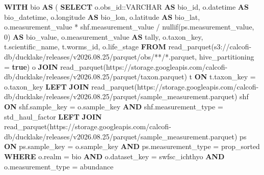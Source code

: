 \documentclass[
  letterpaper,
  DIV=11,
  numbers=noendperiod]{scrreprt}
\newenvironment{Shaded}{\begin{snugshade}}{\end{snugshade}}
\newcommand{\CharTok}[1]{\textcolor[rgb]{0.13,0.47,0.30}{#1}}
\newcommand{\DecValTok}[1]{\textcolor[rgb]{0.68,0.00,0.00}{#1}}
\newcommand{\FunctionTok}[1]{\textcolor[rgb]{0.28,0.35,0.67}{#1}}
\newcommand{\KeywordTok}[1]{\textcolor[rgb]{0.00,0.23,0.31}{\textbf{#1}}}
\newcommand{\NormalTok}[1]{\textcolor[rgb]{0.00,0.23,0.31}{#1}}
\newcommand{\OperatorTok}[1]{\textcolor[rgb]{0.37,0.37,0.37}{#1}}
\newcommand{\StringTok}[1]{\textcolor[rgb]{0.13,0.47,0.30}{#1}}
\begin{document}
\begin{Shaded}
\begin{Highlighting}[]
\KeywordTok{WITH}\NormalTok{ bio }\KeywordTok{AS}\NormalTok{ (}
\KeywordTok{SELECT}
\NormalTok{  o.obs\_id:}\CharTok{:VARCHAR} \KeywordTok{AS}\NormalTok{ bio\_id,}
\NormalTok{  o.datetime }\KeywordTok{AS}\NormalTok{ bio\_datetime,}
\NormalTok{  o.longitude }\KeywordTok{AS}\NormalTok{ bio\_lon,}
\NormalTok{  o.latitude }\KeywordTok{AS}\NormalTok{ bio\_lat,}
\NormalTok{  o.measurement\_value }\OperatorTok{*}\NormalTok{ shf.measurement\_value }\OperatorTok{/} \FunctionTok{nullif}\NormalTok{(ps.measurement\_value, }\DecValTok{0}\NormalTok{) }\KeywordTok{AS}\NormalTok{ bio\_value,}
\NormalTok{  o.measurement\_value }\KeywordTok{AS}\NormalTok{ tally,}
\NormalTok{  o.taxon\_key,}
\NormalTok{  t.scientific\_name,}
\NormalTok{  t.worms\_id,}
\NormalTok{  o.life\_stage}
\KeywordTok{FROM}\NormalTok{ read\_parquet(}\StringTok{\textquotesingle{}s3://calcofi{-}db/ducklake/releases/v2026.08.25/parquet/obs/**/*.parquet\textquotesingle{}}\NormalTok{, hive\_partitioning }\OperatorTok{=} \KeywordTok{true}\NormalTok{) o}
\KeywordTok{JOIN}\NormalTok{ read\_parquet(}\StringTok{\textquotesingle{}https://storage.googleapis.com/calcofi{-}db/ducklake/releases/v2026.08.25/parquet/taxon.parquet\textquotesingle{}}\NormalTok{) t }\KeywordTok{ON}\NormalTok{ t.taxon\_key }\OperatorTok{=}\NormalTok{ o.taxon\_key}
\KeywordTok{LEFT} \KeywordTok{JOIN}\NormalTok{ read\_parquet(}\StringTok{\textquotesingle{}https://storage.googleapis.com/calcofi{-}db/ducklake/releases/v2026.08.25/parquet/sample\_measurement.parquet\textquotesingle{}}\NormalTok{) shf }\KeywordTok{ON}\NormalTok{ shf.sample\_key }\OperatorTok{=}\NormalTok{ o.sample\_key }\KeywordTok{AND}\NormalTok{ shf.measurement\_type }\OperatorTok{=} \StringTok{\textquotesingle{}std\_haul\_factor\textquotesingle{}}
\KeywordTok{LEFT} \KeywordTok{JOIN}\NormalTok{ read\_parquet(}\StringTok{\textquotesingle{}https://storage.googleapis.com/calcofi{-}db/ducklake/releases/v2026.08.25/parquet/sample\_measurement.parquet\textquotesingle{}}\NormalTok{) ps }\KeywordTok{ON}\NormalTok{ ps.sample\_key }\OperatorTok{=}\NormalTok{ o.sample\_key }\KeywordTok{AND}\NormalTok{ ps.measurement\_type }\OperatorTok{=} \StringTok{\textquotesingle{}prop\_sorted\textquotesingle{}}
\KeywordTok{WHERE}\NormalTok{ o.realm }\OperatorTok{=} \StringTok{\textquotesingle{}bio\textquotesingle{}}
    \KeywordTok{AND}\NormalTok{ o.dataset\_key }\OperatorTok{=} \StringTok{\textquotesingle{}swfsc\_ichthyo\textquotesingle{}}
    \KeywordTok{AND}\NormalTok{ o.measurement\_type }\OperatorTok{=} \StringTok{\textquotesingle{}abundance\textquotesingle{}}

\end{Highlighting}
\end{Shaded}
\end{document}
